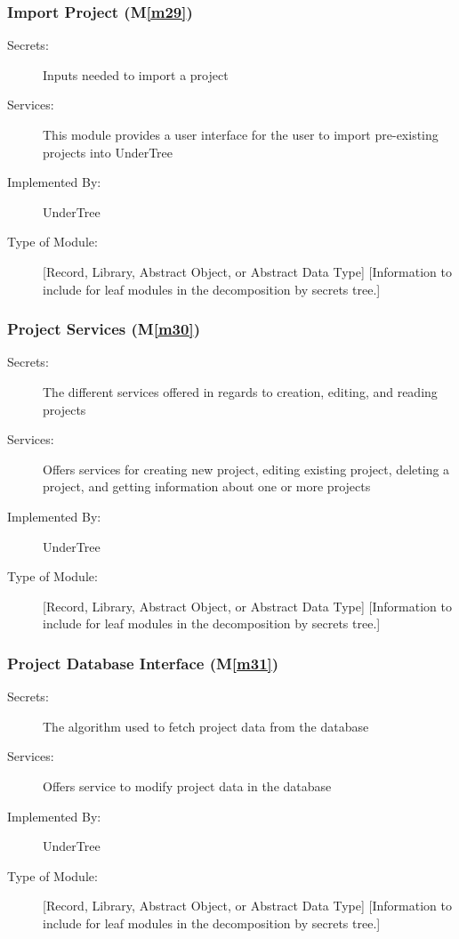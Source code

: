 \documentclass[12pt, titlepage]{article}
\newcommand{\mref}[1]{M\ref{#1}}
\begin{document}
	\subsubsection{Import Project (\mref{m29})}
	
	\begin{description}
		\item[Secrets:] Inputs needed to import a project
		\item[Services:] This module provides a user interface for the user to import pre-existing projects into UnderTree
		\item[Implemented By:] UnderTree
		\item[Type of Module:] [Record, Library, Abstract Object, or Abstract Data Type]
		[Information to include for leaf modules in the decomposition by secrets tree.]
	\end{description}
	
	\subsubsection{Project Services (\mref{m30})}
	
	\begin{description}
		\item[Secrets:] The different services offered in regards to creation, editing, and reading projects
		\item[Services:] Offers services for creating new project, editing existing project, deleting a project, and getting information about one or more projects
		\item[Implemented By:] UnderTree
		\item[Type of Module:] [Record, Library, Abstract Object, or Abstract Data Type]
		[Information to include for leaf modules in the decomposition by secrets tree.]
	\end{description}
	
	\subsubsection{Project Database Interface (\mref{m31})}
	
	\begin{description}
		\item[Secrets:] The algorithm used to fetch project data from the database
		\item[Services:] Offers service to modify project data in the database
		\item[Implemented By:] UnderTree
		\item[Type of Module:] [Record, Library, Abstract Object, or Abstract Data Type]
		[Information to include for leaf modules in the decomposition by secrets tree.]
	\end{description}
	
\end{document}
